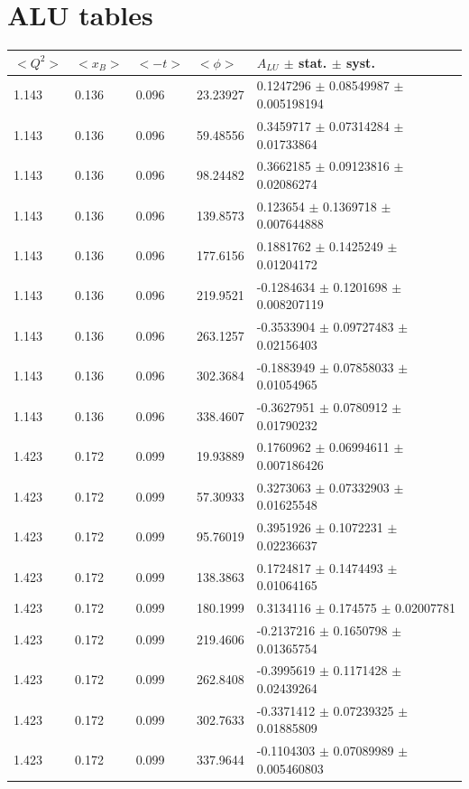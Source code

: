 \section*{ALU tables}
\begin{table}[!h]
   \begin{center}
      \begin{tabular}{||l|l|l|l|l||}
         \hline
 $<Q^{2}>$ & $<x_{B}>$ & $<-t>$ & $<\phi>$ & $A_{LU}$ $\pm$ stat. $\pm$ syst.\\
         \hline
         1.143 & 0.136 & 0.096 & 23.23927  & 0.1247296  $\pm$  0.08549987 $\pm$ 
0.005198194 \\
         1.143 & 0.136 & 0.096 & 59.48556  & 0.3459717  $\pm$  0.07314284 $\pm$   
0.01733864  \\
         1.143 & 0.136 & 0.096 & 98.24482  & 0.3662185  $\pm$  0.09123816 $\pm$   
0.02086274  \\
         1.143 & 0.136 & 0.096 & 139.8573  & 0.123654   $\pm$  0.1369718  $\pm$   
0.007644888 \\
         1.143 & 0.136 & 0.096 & 177.6156  & 0.1881762  $\pm$  0.1425249  $\pm$   
0.01204172  \\
         1.143 & 0.136 & 0.096 & 219.9521  & -0.1284634 $\pm$  0.1201698  $\pm$   
0.008207119 \\
         1.143 & 0.136 & 0.096 & 263.1257  & -0.3533904 $\pm$  0.09727483  
$\pm$   0.02156403  \\
         1.143 & 0.136 & 0.096 & 302.3684  & -0.1883949 $\pm$  0.07858033  $\pm$   0.01054965  \\
         1.143 & 0.136 & 0.096 & 338.4607  & -0.3627951 $\pm$  0.0780912   $\pm$   0.01790232  \\
         \hline

         1.423 & 0.172 & 0.099 & 19.93889  & 0.1760962  $\pm$ 0.06994611  $\pm$ 
0.007186426   \\
         1.423 & 0.172 & 0.099 & 57.30933  & 0.3273063  $\pm$ 0.07332903  $\pm$ 0.01625548    \\
         1.423 & 0.172 & 0.099 & 95.76019  & 0.3951926  $\pm$ 0.1072231   $\pm$ 0.02236637    \\
         1.423 & 0.172 & 0.099 & 138.3863   & 0.1724817  $\pm$ 0.1474493   
$\pm$ 0.01064165    \\
         1.423 & 0.172 & 0.099 & 180.1999  & 0.3134116  $\pm$ 0.174575    $\pm$ 
0.02007781\\
         1.423 & 0.172 & 0.099 & 219.4606  & -0.2137216 $\pm$ 0.1650798   $\pm$ 0.01365754    \\
         1.423 & 0.172 & 0.099 & 262.8408  & -0.3995619 $\pm$ 0.1171428   $\pm$ 0.02439264    \\
         1.423 & 0.172 & 0.099 & 302.7633  & -0.3371412 $\pm$ 0.07239325  $\pm$ 0.01885809    \\
         1.423 & 0.172 & 0.099 & 337.9644  & -0.1104303 $\pm$ 0.07089989  $\pm$ 0.005460803   \\


\end{tabular}
\end{center}
\end{table}
